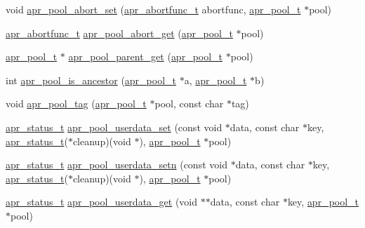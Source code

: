 \begin{DoxyCompactItemize}
void \hyperlink{group__apr__pools_gaa658b1f10dd13967eaa7c4156d4c2174}{apr\-\_\-pool\-\_\-abort\-\_\-set} (\hyperlink{group__apr__pools_ga0a1fe549a7c45b864c003ddf12115365}{apr\-\_\-abortfunc\-\_\-t} abortfunc, \hyperlink{group__apr__pools_gaf137f28edcf9a086cd6bc36c20d7cdfb}{apr\-\_\-pool\-\_\-t} $\ast$pool)
\item 
\hyperlink{group__apr__pools_ga0a1fe549a7c45b864c003ddf12115365}{apr\-\_\-abortfunc\-\_\-t} \hyperlink{group__apr__pools_gaf7610c30ef5f84a8742c0b3e63fdd7b0}{apr\-\_\-pool\-\_\-abort\-\_\-get} (\hyperlink{group__apr__pools_gaf137f28edcf9a086cd6bc36c20d7cdfb}{apr\-\_\-pool\-\_\-t} $\ast$pool)
\item 
\hyperlink{group__apr__pools_gaf137f28edcf9a086cd6bc36c20d7cdfb}{apr\-\_\-pool\-\_\-t} $\ast$ \hyperlink{group__apr__pools_ga94db31f40609b15b592ff47f989ca9ec}{apr\-\_\-pool\-\_\-parent\-\_\-get} (\hyperlink{group__apr__pools_gaf137f28edcf9a086cd6bc36c20d7cdfb}{apr\-\_\-pool\-\_\-t} $\ast$pool)
\item 
int \hyperlink{group__apr__pools_ga05d299f778659d1e0806140d8a7fea79}{apr\-\_\-pool\-\_\-is\-\_\-ancestor} (\hyperlink{group__apr__pools_gaf137f28edcf9a086cd6bc36c20d7cdfb}{apr\-\_\-pool\-\_\-t} $\ast$a, \hyperlink{group__apr__pools_gaf137f28edcf9a086cd6bc36c20d7cdfb}{apr\-\_\-pool\-\_\-t} $\ast$b)
\item 
void \hyperlink{group__apr__pools_gaeaa872f7999740a60803e95429890518}{apr\-\_\-pool\-\_\-tag} (\hyperlink{group__apr__pools_gaf137f28edcf9a086cd6bc36c20d7cdfb}{apr\-\_\-pool\-\_\-t} $\ast$pool, const char $\ast$tag)
\item 
\hyperlink{group__apr__errno_gaf76ee4543247e9fb3f3546203e590a6c}{apr\-\_\-status\-\_\-t} \hyperlink{group__apr__pools_ga78d1aa2d9fa842d83eaffccb0f0c0c5c}{apr\-\_\-pool\-\_\-userdata\-\_\-set} (const void $\ast$data, const char $\ast$key, \hyperlink{group__apr__errno_gaf76ee4543247e9fb3f3546203e590a6c}{apr\-\_\-status\-\_\-t}($\ast$cleanup)(void $\ast$), \hyperlink{group__apr__pools_gaf137f28edcf9a086cd6bc36c20d7cdfb}{apr\-\_\-pool\-\_\-t} $\ast$pool)
\item 
\hyperlink{group__apr__errno_gaf76ee4543247e9fb3f3546203e590a6c}{apr\-\_\-status\-\_\-t} \hyperlink{group__apr__pools_ga435644c493dc5b10d80c4b99b8cd4589}{apr\-\_\-pool\-\_\-userdata\-\_\-setn} (const void $\ast$data, const char $\ast$key, \hyperlink{group__apr__errno_gaf76ee4543247e9fb3f3546203e590a6c}{apr\-\_\-status\-\_\-t}($\ast$cleanup)(void $\ast$), \hyperlink{group__apr__pools_gaf137f28edcf9a086cd6bc36c20d7cdfb}{apr\-\_\-pool\-\_\-t} $\ast$pool)
\item 
\hyperlink{group__apr__errno_gaf76ee4543247e9fb3f3546203e590a6c}{apr\-\_\-status\-\_\-t} \hyperlink{group__apr__pools_gaf930f1fad2cf92a2432c0814c8a0b86f}{apr\-\_\-pool\-\_\-userdata\-\_\-get} (void $\ast$$\ast$data, const char $\ast$key, \hyperlink{group__apr__pools_gaf137f28edcf9a086cd6bc36c20d7cdfb}{apr\-\_\-pool\-\_\-t} $\ast$pool)
\end{DoxyCompactItemize}


